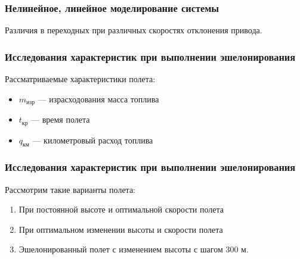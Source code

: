 \documentclass{beamer}
\begin{document}
\begin{frame}[t]
    \frametitle{Нелинейное, линейное моделирование системы}
\begin{center}
    Различия в переходных при различных скоростях отклонения привода. 
    \vspace{14pt}

        \begin{minipage}{0.45\textwidth}
            \begin{center}
            \resizebox{1.2\textwidth}{!}{}
            \end{center}
        \end{minipage}
        \hfill
        \begin{minipage}{0.45\textwidth}
            \begin{center}
                \resizebox{1.2\textwidth}{!}{}
            \end{center}
        \end{minipage}
\end{center}
\end{frame}

\begin{frame}[t]
    \frametitle{Исследования характеристик при выполнении эшелонирования}
    Рассматриваемые характеристики полета:
    \begin{itemize}
        \item $m_{изр}$ --- израсходования масса топлива
        \item $t_{кр}$ --- время полета
        \item $q_{км}$ --- километровый расход топлива 
    \end{itemize}
\end{frame}

\begin{frame}[t]
    \frametitle{Исследования характеристик при выполнении эшелонирования}
    \begin{block}{Рассмотрим такие варианты полета:
        }
        \begin{enumerate}
            \item При постоянной высоте и оптимальной скорости полета 
            \item При оптимальном изменении высоты и скорости полета
            \item Эшелонированный полет с изменением высоты с шагом 300 м.
        \end{enumerate}
    \end{block}
\end{frame}
\end{document}
